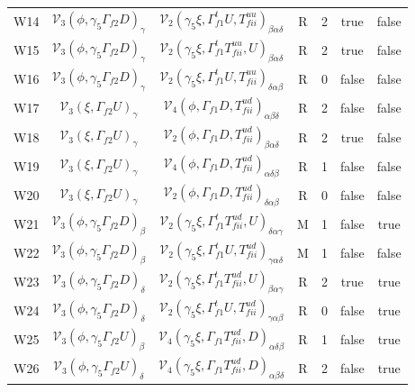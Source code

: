 \documentclass{article}[12pt]
\begin{document}
{\begin{landscape}
\begin{tabular}{ c c c c c c c }
W14& ${\mathcal V}_3(\phi,\gamma_5\Gamma_{f2}D)_{\gamma}$  & ${\mathcal V}_2(\gamma_5\xi, \Gamma_{f1}^t U, T^{uu}_{fii})_{\beta\alpha\delta}$  & R & 2 & true   & false \\
W15& ${\mathcal V}_3(\phi,\gamma_5\Gamma_{f2}D)_{\gamma}$  & ${\mathcal V}_2(\gamma_5\xi, \Gamma_{f1}^t T^{uu}_{fii}, U)_{\beta\alpha\delta}$  & R & 2 & true   & false \\
W16& ${\mathcal V}_3(\phi,\gamma_5\Gamma_{f2}D)_{\gamma}$  & ${\mathcal V}_2(\gamma_5\xi, \Gamma_{f1}^t U, T^{uu}_{fii})_{\delta\alpha\beta}$  & R & 0 & false  & false \\
W17& ${\mathcal V}_3(\xi,\Gamma_{f2}U)_{\gamma}$  & ${\mathcal V}_4(\phi, \Gamma_{f1}   D, T^{ud}_{fii})_{\alpha\beta\delta}$  & R & 2 & false  & false \\
W18& ${\mathcal V}_3(\xi,\Gamma_{f2}U)_{\gamma}$  & ${\mathcal V}_2(\phi, \Gamma_{f1}   D, T^{ud}_{fii})_{\beta\alpha\delta}$  & R & 2 & true   & false \\
W19& ${\mathcal V}_3(\xi,\Gamma_{f2}U)_{\gamma}$  & ${\mathcal V}_4(\phi, \Gamma_{f1}   D, T^{ud}_{fii})_{\alpha\delta\beta}$  & R & 1 & false  & false \\
W20& ${\mathcal V}_3(\xi,\Gamma_{f2}U)_{\gamma}$  & ${\mathcal V}_2(\phi, \Gamma_{f1}   D, T^{ud}_{fii})_{\delta\alpha\beta}$  & R & 0 & false  & false \\
W21& ${\mathcal V}_3(\phi,\gamma_5\Gamma_{f2}D)_{\beta}$   & ${\mathcal V}_2(\gamma_5\xi, \Gamma_{f1}^t T^{ud}_{fii}, U)_{\delta\alpha\gamma}$ & M & 1 & false  & true \\
W22& ${\mathcal V}_3(\phi,\gamma_5\Gamma_{f2}D)_{\beta}$   & ${\mathcal V}_2(\gamma_5\xi, \Gamma_{f1}^t U, T^{ud}_{fii})_{\gamma\alpha\delta}$ & M & 1 & false  & false \\
W23& ${\mathcal V}_3(\phi,\gamma_5\Gamma_{f2}D)_{\delta}$  & ${\mathcal V}_2(\gamma_5\xi, \Gamma_{f1}^t T^{ud}_{fii}, U)_{\beta\alpha\gamma}$  & R & 2 & true   & true \\
W24& ${\mathcal V}_3(\phi,\gamma_5\Gamma_{f2}D)_{\delta}$  & ${\mathcal V}_2(\gamma_5\xi, \Gamma_{f1}^t U, T^{ud}_{fii})_{\gamma\alpha\beta}$  & R & 0 & false  & true \\
W25& ${\mathcal V}_3(\phi,\gamma_5\Gamma_{f2}U)_{\beta}$   & ${\mathcal V}_4(\gamma_5\xi, \Gamma_{f1}   T^{ud}_{fii}, D)_{\alpha\delta\beta}$  & R & 1 & false  & true \\
W26& ${\mathcal V}_3(\phi,\gamma_5\Gamma_{f2}U)_{\delta}$  & ${\mathcal V}_4(\gamma_5\xi, \Gamma_{f1}   T^{ud}_{fii}, D)_{\alpha\beta\delta}$  & R & 2 & false  & true \\

\end{tabular}
\end{landscape}}
\end{document}
